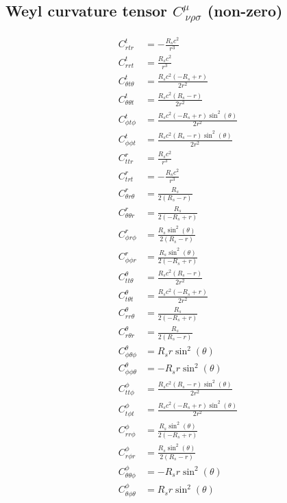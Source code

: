 \documentclass{article}
\begin{document}
\subsection{Weyl curvature tensor $C^{\mu}_{\ \nu\rho\sigma}$ (non-zero)}
\begin{align}
C^{t}_{r t r} &= - \frac{R_{s} c^{2}}{r^{3}} \\
C^{t}_{r r t} &= \frac{R_{s} c^{2}}{r^{3}} \\
C^{t}_{\theta t \theta} &= \frac{R_{s} c^{2} \left(- R_{s} + r\right)}{2 r^{2}} \\
C^{t}_{\theta \theta t} &= \frac{R_{s} c^{2} \left(R_{s} - r\right)}{2 r^{2}} \\
C^{t}_{\phi t \phi} &= \frac{R_{s} c^{2} \left(- R_{s} + r\right) \sin^{2}{\left(\theta \right)}}{2 r^{2}} \\
C^{t}_{\phi \phi t} &= \frac{R_{s} c^{2} \left(R_{s} - r\right) \sin^{2}{\left(\theta \right)}}{2 r^{2}} \\
C^{r}_{t t r} &= \frac{R_{s} c^{2}}{r^{3}} \\
C^{r}_{t r t} &= - \frac{R_{s} c^{2}}{r^{3}} \\
C^{r}_{\theta r \theta} &= \frac{R_{s}}{2 \left(R_{s} - r\right)} \\
C^{r}_{\theta \theta r} &= \frac{R_{s}}{2 \left(- R_{s} + r\right)} \\
C^{r}_{\phi r \phi} &= \frac{R_{s} \sin^{2}{\left(\theta \right)}}{2 \left(R_{s} - r\right)} \\
C^{r}_{\phi \phi r} &= \frac{R_{s} \sin^{2}{\left(\theta \right)}}{2 \left(- R_{s} + r\right)} \\
C^{\theta}_{t t \theta} &= \frac{R_{s} c^{2} \left(R_{s} - r\right)}{2 r^{2}} \\
C^{\theta}_{t \theta t} &= \frac{R_{s} c^{2} \left(- R_{s} + r\right)}{2 r^{2}} \\
C^{\theta}_{r r \theta} &= \frac{R_{s}}{2 \left(- R_{s} + r\right)} \\
C^{\theta}_{r \theta r} &= \frac{R_{s}}{2 \left(R_{s} - r\right)} \\
C^{\theta}_{\phi \theta \phi} &= R_{s} r \sin^{2}{\left(\theta \right)} \\
C^{\theta}_{\phi \phi \theta} &= - R_{s} r \sin^{2}{\left(\theta \right)} \\
C^{\phi}_{t t \phi} &= \frac{R_{s} c^{2} \left(R_{s} - r\right) \sin^{2}{\left(\theta \right)}}{2 r^{2}} \\
C^{\phi}_{t \phi t} &= \frac{R_{s} c^{2} \left(- R_{s} + r\right) \sin^{2}{\left(\theta \right)}}{2 r^{2}} \\
C^{\phi}_{r r \phi} &= \frac{R_{s} \sin^{2}{\left(\theta \right)}}{2 \left(- R_{s} + r\right)} \\
C^{\phi}_{r \phi r} &= \frac{R_{s} \sin^{2}{\left(\theta \right)}}{2 \left(R_{s} - r\right)} \\
C^{\phi}_{\theta \theta \phi} &= - R_{s} r \sin^{2}{\left(\theta \right)} \\
C^{\phi}_{\theta \phi \theta} &= R_{s} r \sin^{2}{\left(\theta \right)} \\
\end{align}
\end{document}
